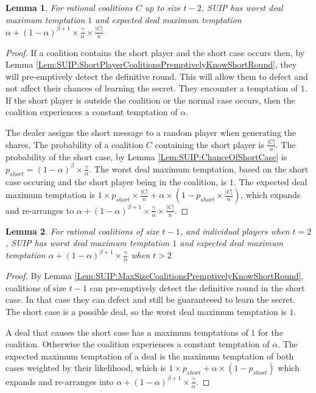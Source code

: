 \documentclass{dalcsthesis}
\newtheorem{lemma}{Lemma}
\begin{document}
\begin{lemma} For rational coalitions $C$ up to size $t-2$, SUIP has worst deal maximum temptation $1$ and expected deal maximum temptation $\alpha + (1-\alpha)^{\beta+1} \times \frac{\gamma}{\alpha} \times \frac{|C|}{n}$ \label{Lem:SUIP:AllCoalitionsTempted} \end{lemma}
\begin{proof}
If a coalition contains the short player and the short case occurs then, by Lemma \ref{Lem:SUIP:ShortPlayerCoalitionsPremptivelyKnowShortRound}, they will pre-emptively detect the definitive round. This will allow them to defect and not affect their chances of learning the secret. They encounter a temptation of $1$. If the short player is outside the coalition or the normal case occurs, then the coalition experiences a constant temptation of $\alpha$.

The dealer assigns the short message to a random player when generating the shares. The probability of a coalition $C$ containing the short player is $\frac{|C|}{n}$. The probability of the short case, by Lemma \ref{Lem:SUIP:ChanceOfShortCase} is $p_{short} = (1-\alpha)^\beta \times \frac{\gamma}{\alpha}$. The worst deal maximum temptation, based on the short case occuring and the short player being in the coalition, is $1$. The expected deal maximum temptation is $1 \times p_{short} \times \frac{|C|}{n} + \alpha \times (1 - p_{short} \times \frac{|C|}{n})$, which expands and re-arranges to $\alpha + (1-\alpha)^{\beta+1} \times \frac{\gamma}{\alpha} \times \frac{|C|}{n}$.
\end{proof}

\begin{lemma} For rational coalitions of size $t-1$, and individual players when $t=2$, SUIP has worst deal maximum temptation $1$ and expected deal maximum temptation $\alpha + (1-\alpha)^{\beta+1} \times \frac{\gamma}{\alpha}$ when $t > 2$ \label{Lem:SUIP:MaxSizeCoalitionsTemptedMore} \end{lemma}
\begin{proof}
By Lemma \ref{Lem:SUIP:MaxSizeCoalitionsPremptivelyKnowShortRound}, coalitions of size $t-1$ can pre-emptively detect the definitive round in the short case. In that case they can defect and still be guaranteeed to learn the secret. The short case is a possible deal, so the worst deal maximum temptation is $1$.

A deal that causes the short case has a maximum temptations of $1$ for the coalition. Otherwise the coalition experiences a constant temptation of $\alpha$. The expected maximum temptation of a deal is the maximum temptation of both cases weighted by their likelihood, which is $1 \times p_{short} + \alpha \times (1-p_{short})$ which expands and re-arranges into $\alpha + (1-\alpha)^{\beta+1} \times \frac{\gamma}{\alpha}$.
\end{proof}
\end{document}
